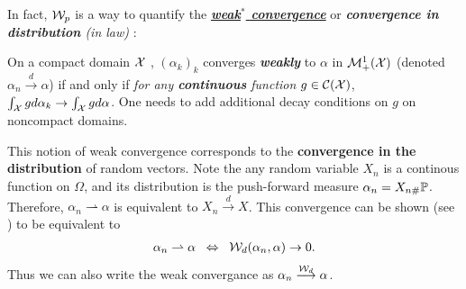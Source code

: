 \documentclass[11pt]{article}
\begin{document}
\begin{itemize}
\begin{remark}
In fact, ${\mathcal W}_{p}$ is a way to quantify the \underline{\emph{\textbf{weak$^{*}$ convergence}}} or \emph{\textbf{convergence in distribution} (in law)} \citep{villani2009optimal}: 
\begin{definition}
On a compact domain ${\mathcal X}$ , $(\alpha_k)_k$ converges \textbf{\textit{weakly}} to $\alpha$ in ${\mathcal M}_{+}^{1}({\mathcal X})$ (denoted $\alpha_{n}\stackrel{d}{\rightarrow} \alpha$) if and only if \emph{for any \textbf{continuous} function} $g \in {\mathcal C}({\mathcal X})$, $\int_{{\mathcal X}} g d\alpha_k \rightarrow \int_{{\mathcal X}} g d\alpha$. One needs to add additional decay conditions on $g$ on noncompact domains. 
\end{definition}

This notion of weak convergence corresponds to the \textbf{convergence in the distribution} of random vectors. Note the any random variable $X_{n}$ is a continous function on $\Omega$, and its distribution is the push-forward measure $\alpha_{n} = X_{n\#}{\mathbb P}$. Therefore, $\alpha_{n}  \rightharpoonup \alpha$  is equivalent to $X_{n}\stackrel{d}{\rightarrow} X$. This convergence can be shown (see \citep{villani2009optimal, santambrogio2015optimal}) to be equivalent to 
\begin{align*}
\alpha_{n} \rightharpoonup \alpha \;\; \Leftrightarrow \;\;{\mathcal W}_{d}(\alpha_{n}, \alpha) \rightarrow 0.
\end{align*}
Thus we can also write the weak convergance as $\alpha_{n}\stackrel{{\mathcal W}_{d}}{\longrightarrow} \alpha$.
\end{remark}
\end{itemize}
\end{document}
